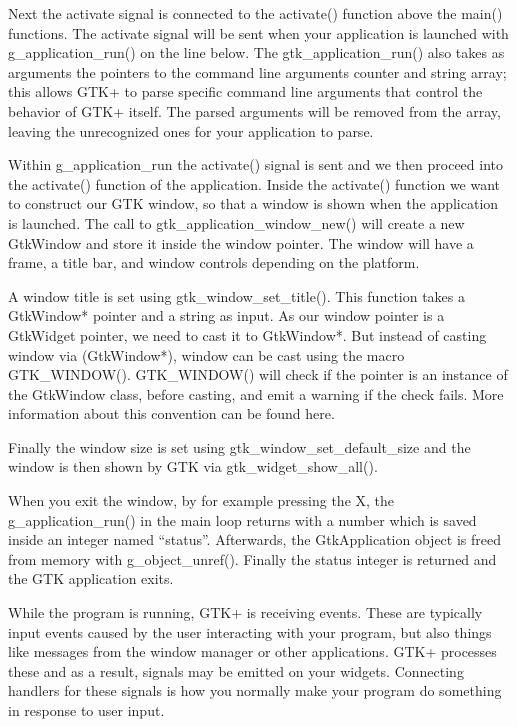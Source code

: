 \documentclass[a4paper,openany,twoside,draft]{book}
\begin{document}
Next the activate signal is connected to the activate() function above the main() functions. The activate signal will be sent when your application is launched with g\_application\_run() on the line below. The gtk\_application\_run() also takes as arguments the pointers to the command line arguments counter and string array; this allows GTK+ to parse specific command line arguments that control the behavior of GTK+ itself. The parsed arguments will be removed from the array, leaving the unrecognized ones for your application to parse.

Within g\_application\_run the activate() signal is sent and we then proceed into the activate() function of the application. Inside the activate() function we want to construct our GTK window, so that a window is shown when the application is launched. The call to gtk\_application\_window\_new() will create a new GtkWindow and store it inside the window pointer. The window will have a frame, a title bar, and window controls depending on the platform.

A window title is set using gtk\_window\_set\_title(). This function takes a GtkWindow* pointer and a string as input. As our window pointer is a GtkWidget pointer, we need to cast it to GtkWindow*. But instead of casting window via (GtkWindow*), window can be cast using the macro GTK\_WINDOW(). GTK\_WINDOW() will check if the pointer is an instance of the GtkWindow class, before casting, and emit a warning if the check fails. More information about this convention can be found here.

Finally the window size is set using gtk\_window\_set\_default\_size and the window is then shown by GTK via gtk\_widget\_show\_all().

When you exit the window, by for example pressing the X, the g\_application\_run() in the main loop returns with a number which is saved inside an integer named ``status''. Afterwards, the GtkApplication object is freed from memory with g\_object\_unref(). Finally the status integer is returned and the GTK application exits.

While the program is running, GTK+ is receiving events. These are typically input events caused by the user interacting with your program, but also things like messages from the window manager or other applications. GTK+ processes these and as a result, signals may be emitted on your widgets. Connecting handlers for these signals is how you normally make your program do something in response to user input.
\end{document}
